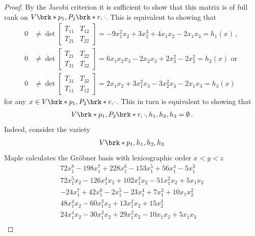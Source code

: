 \begin{proof}
  By the Jacobi criterion it is sufficient to show that this matrix is
  of full rank on $V\brk*{p_1,P_2\brk*{r,\cdot}}$.
  This is equivalent to showing that
  \begin{align*}
    0&\neq \det\begin{bmatrix}
      T_{11}&T_{12}\\T_{21}&T_{22}
    \end{bmatrix}
    =-9x_1^2x_2+3x_2^3+4x_1x_2-2x_1x_3
    =h_1(x)\,, \\
    0&\neq \det\begin{bmatrix}
      T_{21}&T_{22}\\T_{31}&T_{32}
    \end{bmatrix}
    =6x_1x_2x_3-2x_2x_3+2x_3^2-2x_2^2
    =h_2(x)\text{ or } \\
    0&\neq \det\begin{bmatrix}
      T_{31}&T_{32}\\T_{11}&T_{12}
    \end{bmatrix}
    =2x_1x_2+3x_1^2x_3-3x_2^2x_3-2x_1x_3
    =h_3(x)
  \end{align*}
  for any $x\in V\brk*{p_1,P_2\brk*{r,\cdot}}$. This in turn is equivalent to showing that
  \begin{align}
    V\brk*{p_1,P_2\brk*{r,\cdot},h_1,h_2,h_3}=\emptyset\,.\label{eq:n3_ex_smoothness_varCond}
  \end{align}
  Indeed, consider the variety
  \begin{align}
    V\brk*{p_1,h_1,h_2,h_3} \label{eq:n3_ex_smoothness_subvar}
  \end{align}
  Maple calculates the Gröbner basis with lexicographic order $x<y<z$
  \begin{align*}
    72x_1^8 - 198x_1^7 + 228x_1^6 - 153x_1^5 + 56x_1^4 - 5x_1^3 \\
    72x_1^5x_2 - 126x_1^4x_2 + 102x_1^3x_2 - 51x_1^2x_2 + 5x_1x_2 \\
    -24x_1^7 + 42x_1^6 - 2x_1^5 - 23x_1^4 + 7x_1^3 + 10x_1x_2^2 \\
    48x_1^4x_2 - 60x_1^3x_2 + 13x_1^2x_2 + 15x_2^3 \\
    24x_1^4x_2 - 30x_1^3x_2 + 29x_1^2x_2 - 10x_1x_2 + 5x_1x_3 \\

\end{align*}
\end{proof}
